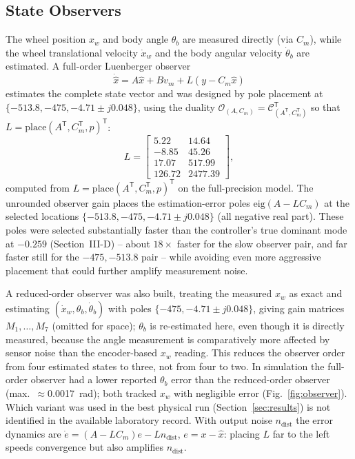 \documentclass[conference]{IEEEtran}
\newcommand{\mat}[1]{\begin{bmatrix}#1\end{bmatrix}}
\begin{document}
\subsection{State Observers}
The wheel position $x_w$ and body angle $\theta_b$ are measured directly (via $C_m$), while the wheel translational velocity $\dot x_w$ and the body angular velocity $\dot\theta_b$ are estimated. A full-order Luenberger observer
\begin{equation}
\dot{\hat x}=A\hat x+Bv_m+L(y-C_m\hat x)
\end{equation}
estimates the complete state vector and was designed by pole placement at $\{-513.8,-475,-4.71\pm j0.048\}$, using the duality $\mathcal{O}_{(A,C_m)}=\mathcal{C}_{(A^{\mathsf T},C_m^{\mathsf T})}^{\mathsf T}$ so that $L=\mathrm{place}(A^{\mathsf T},C_m^{\mathsf T},p)^{\mathsf T}$:
\begin{equation}
L = \mat{5.22&14.64\\-8.85&45.26\\17.07&517.99\\126.72&2477.39},
\end{equation}
computed from $L=\mathrm{place}(A^{\mathsf T},C_m^{\mathsf T},p)^{\mathsf T}$ on the full-precision model. The unrounded observer gain places the estimation-error poles $\mathrm{eig}(A-LC_m)$ at the selected locations $\{-513.8,-475,-4.71\pm j0.048\}$ (all negative real part). These poles were selected substantially faster than the controller's true dominant mode at $-0.259$ (Section~III-D) -- about $18\times$ faster for the slow observer pair, and far faster still for the $-475,-513.8$ pair -- while avoiding even more aggressive placement that could further amplify measurement noise.

A reduced-order observer was also built, treating the measured $x_w$ as exact and estimating $(\dot x_w,\theta_b,\dot\theta_b)$ with poles $\{-475,-4.71\pm j0.048\}$, giving gain matrices $M_1,\dots,M_7$ (omitted for space); $\theta_b$ is re-estimated here, even though it is directly measured, because the angle measurement is comparatively more affected by sensor noise than the encoder-based $x_w$ reading. This reduces the observer order from four estimated states to three, not from four to two. In simulation the full-order observer had a lower reported $\theta_b$ error than the reduced-order observer (max.\ $\approx$0.0017~rad); both tracked $x_w$ with negligible error (Fig.~\ref{fig:observer}). Which variant was used in the best physical run (Section~\ref{sec:results}) is not identified in the available laboratory record. With output noise $n_{\text{dist}}$ the error dynamics are $\dot e=(A-LC_m)e-Ln_{\text{dist}}$, $e=x-\hat x$: placing $L$ far to the left speeds convergence but also amplifies $n_{\text{dist}}$.
\end{document}

